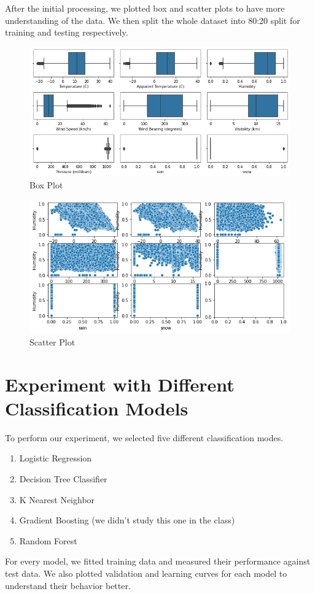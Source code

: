 After the initial processing, we plotted box and scatter plots to have more understanding of the data. We then split the whole dataset into 80:20 split for training and testing respectively.

\begin{figure}[h]
\centering
\includegraphics[width=.92\linewidth]{boxplot}
\caption{Box Plot}%
\label{fig:boxplot}
\end{figure}

\begin{figure}[h]
\centering
\includegraphics[width=.92\linewidth]{scatterplot}
\caption{Scatter Plot}%
\label{fig:scatterplot}
\end{figure}


\section{Experiment with Different Classification Models}
To perform our experiment, we selected five different classification modes.
\begin{enumerate}
\item Logistic Regression
\item Decision Tree Classifier
\item K Nearest Neighbor
\item Gradient Boosting (we didn’t study this one in the class)
\item Random Forest
\end{enumerate}
For every model, we fitted training data and measured their performance against test data. We also plotted validation and learning curves for each model to understand their behavior better.


